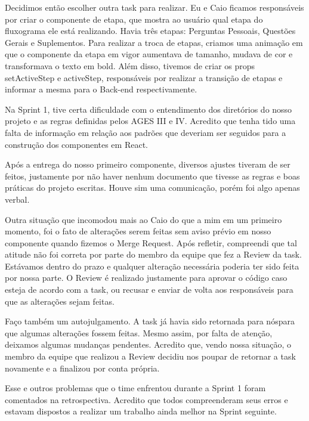 \indent \originaltab{}Decidimos então escolher outra task para realizar. Eu e Caio ficamos responsáveis por criar o componente de etapa, que mostra ao usuário qual etapa do fluxograma ele está realizando. Havia três etapas: Perguntas Pessoais, Questões Gerais e Suplementos. Para realizar a troca de etapas, criamos uma animação em que o componente da etapa em vigor aumentava de tamanho, mudava de cor e transformava o texto em bold. Além disso, tivemos de criar os props setActiveStep e activeStep, responsáveis por realizar a transição de etapas e informar a mesma para o Back-end respectivamente.\originalspace{}

\begin{reflection}
\indent \originaltab{}Na Sprint 1, tive certa dificuldade com o entendimento dos diretórios do nosso projeto e as regras definidas pelos AGES III e IV. Acredito que tenha tido uma falta de informação em relação aos padrões que deveriam ser seguidos para a construção dos componentes em React.\originalspace{}

\indent \originaltab{}\originaltab{}Após a entrega do nosso primeiro componente, diversos ajustes tiveram de ser feitos, justamente por não haver nenhum documento que tivesse as regras e boas práticas do projeto escritas. Houve sim uma comunicação, porém foi algo apenas verbal.\originalspace{}

\indent \originaltab{}Outra situação que incomodou mais ao Caio do que a mim em um primeiro momento, foi o fato de alterações serem feitas sem aviso prévio em nosso componente quando fizemos o Merge Request. Após refletir, compreendi que tal atitude não foi correta por parte do membro da equipe que fez a Review da task. Estávamos dentro do prazo e qualquer alteração necessária poderia ter sido feita por nossa parte. O Review é realizado justamente para aprovar o código caso esteja de acordo com a task, ou recusar e enviar de volta aos responsáveis para que as alterações sejam feitas.\originalspace{}

\indent \originaltab{}Faço também um autojulgamento. A task já havia sido retornada para nós\originalspace{}\originalspace{}para que algumas alterações fossem feitas. Mesmo assim, por falta de atenção, deixamos algumas mudanças pendentes. Acredito que, vendo nossa situação, o membro da equipe que realizou a Review decidiu nos poupar de retornar a task novamente e a finalizou por conta própria.

\indent \originaltab{}Esse e outros problemas que o time enfrentou durante a Sprint 1 foram comentados na retrospectiva. Acredito que todos compreenderam seus erros e estavam dispostos a realizar um trabalho ainda melhor na Sprint seguinte.

\end{reflection}
